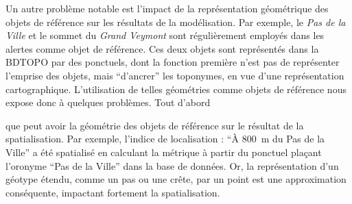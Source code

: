 Un autre problème notable est l'impact de la représentation
géométrique des objets de référence sur les résultats de la
modélisation. Par exemple, le \emph{Pas de la Ville} et le sommet du
\emph{Grand Veymont} sont régulièrement employés dans les alertes
comme objet de référence. Ces deux objets sont représentés dans la
BDTOPO par des ponctuels, dont la fonction première n'est pas de
représenter l'emprise des objets, mais \enquote{d'ancrer} les
toponymes, en vue d'une représentation cartographique. L'utilisation
de telles géométries comme objets de référence nous expose donc à
quelques problèmes.
%
Tout d'abord


que peut avoir la géométrie des
objets de référence sur le résultat de la spatialisation. Par exemple,
l'indice de localisation : \enquote{À \SI{800}{\meter} du Pas de la
  Ville} a été spatialisé en calculant la métrique
 à partir du ponctuel plaçant l'oronyme
\enquote{Pas de la Ville} dans la base de données. Or, la
représentation d'un géotype étendu, comme un pas ou une crête, par un
point est une approximation conséquente, impactant fortement la
spatialisation.

